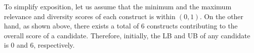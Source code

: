\begin{comment}
   \begin{algorithm}
\caption{Update Bounds for Candidates}
\begin{algorithmic}[1]
\State \( res \leftarrow LLM(Q) \)
\For{each candidate \( c \in C \)}
    \State \( Q_c \leftarrow \) set of all questions contributing to the score of c
    \If{\( Q \in Q_c \)} 
        \If{scoring function is based on sum}
            \State \( LB_c \gets LB_c + res \) 
            \State \( UB_c \gets UB_c - (MAX\_SCORE - res) \)
        \ElsIf{scoring function is based on average}
            \State \( n \gets \text{len}(Q_c) \)
            \State \( LB_c \gets LB_c + \frac{res}{n} \) 
            \State \( UB_c \gets UB_c - \frac{MAX\_SCORE - res}{n} \)
        \EndIf
    \EndIf
\EndFor
\end{algorithmic}
\end{algorithm} 




Given the running example with $\mathcal{F}_{\text{rel+div}}(c, q)$ as the scoring function, let us assume 
\[
Q_k = \emptyset
\]

Given that \(k = 3\), for an arbitrary candidate \(c = \{e_1, e_2, e_3\}\), we express the score as follows:

\begin{align*}
\mathcal{F}(c, q) &= \sum_{e \in c} \text{Rel}(q, e) + \sum_{e_i, e_j \in c} \text{Div}(e_i, e_j) \\
&= \text{Rel}(q, e_1) + \text{Rel}(q, e_2) + \text{Rel}(q, e_3) \\
&\quad + \text{Div}(e_1, e_2) + \text{Div}(e_1, e_3) + \text{Div}(e_2, e_3)
\end{align*}
\end{comment}

To simplify exposition, let us assume that the minimum and the maximum relevance and diversity scores of each construct is within \((0, 1)\). On the other hand, as shown above, there exists a total of $6$ constructs contributing to the overall score of a candidate. Therefore, initially, the LB and UB of any candidate is $0$ and $6$, respectively.


